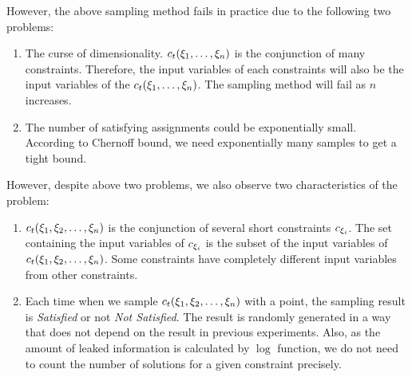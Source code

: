 However, the above sampling method fails in practice due to the following two problems:

\begin{enumerate}
      \item The curse of dimensionality. $c_t({{\xi}_{1}},\ldots,{{\xi}_{n}})$ is
            the conjunction of many constraints. Therefore, the input variables
            of each constraints will also be the input variables of the
            $c_t({{\xi}_{1}},\ldots,{{\xi}_{n}})$. The sampling method will fail
            as $n$ increases. 


      \item The number of satisfying assignments could be exponentially small.
            According to Chernoff bound, we need exponentially many samples to
            get a tight bound. 
\end{enumerate}

However, despite above two problems, we also observe two characteristics of the
problem:
\begin{enumerate}
      \item $c_t({{\xi}_{1}},{{\xi}_{2}},\ldots,{{\xi}_{n}})$ is the conjunction of
            several short constraints $c_{{\xi}_{i}}$. The set containing the
            input variables of $c_{{\xi}_{i}}$ is the subset of the input
            variables of $c_t({{\xi}_{1}},{{\xi}_{2}},\ldots,{{\xi}_{n}})$. Some
            constraints have completely different input variables from other
            constraints.

            \item Each time when we sample $c_t({{\xi}_{1}},{{\xi}_{2}},\ldots,{{\xi}_{n}})$
            with a point, the sampling result is \emph{Satisfied} or not \emph{Not Satisfied}.
            The result is randomly generated in a way that does not depend on the result in 
            previous experiments. Also, as the amount of leaked information is calculated
            by $\log$ function, we do not need to count the number of solutions for 
            a given constraint precisely.

\end{enumerate}

